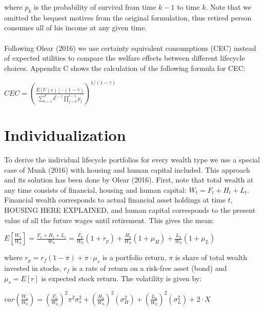 where $p_k$ is the probability of survival from time $k-1$ to time $k$. Note that we omitted the bequest motives from the original formulation, thus retired person consumes all of his income at any given time.

\paragraph*{}Following Olear (2016) we use certainty equivalent consumptions (CEC) instead of expected utilities to compare the welfare effects between different lifecycle choices. Appendix C shows the calculation of the following formula for CEC:

\begin{center}
	$CEC = \left( \frac{E[U(c)]\cdot(1-\gamma)}{\sum^T_{t=1} \delta^{t-1} \prod^{t-1}_{j=0} p_j} \right)^{1/(1-\gamma)}$
\end{center}


\section{Individualization}

To derive the individual lifecycle portfolios for every wealth type we use a special case of Munk (2016) with housing and human capital included. This approach and its solution has been done by Olear (2016). First, note that total wealth at any time consists of financial, housing and human capital: $W_t = F_t + H_t + L_t$. Financial wealth corresponds to actual financial asset holdings at time $t$, HOUSING HERE EXPLAINED, and human capital corresponds to the present value of all the future wages until retirement. This gives the mean:

\begin{center}
	$E[\frac{W_1}{W_0}] = \frac{F_1 + H_1 + L_1}{W_0} =  \frac{F_0}{W_0} (1 + r_p) + \frac{H_0}{W_0}(1+\mu_H) + \frac{L_0}{W_0}(1+\mu_L)$
\end{center}

where $r_p = r_f(1-\pi) + \pi \cdot \mu_s$ is a portfolio return, $\pi$ is share of total wealth invested in stocks, $r_f$ is a rate of return on a risk-free asset (bond) and $\mu_s = E[r]$ is expected stock return. The volatility is given by:

\begin{center}
	$var(\frac{W_1}{W_0}) = (\frac{F_0}{W_0})^2 \pi^2 \sigma^2_s + (\frac{H_0}{W_0})^2(\sigma^2_H) + (\frac{L_0}{W_0})^2(\sigma^2_L) + 2 \cdot X$
\end{center}

